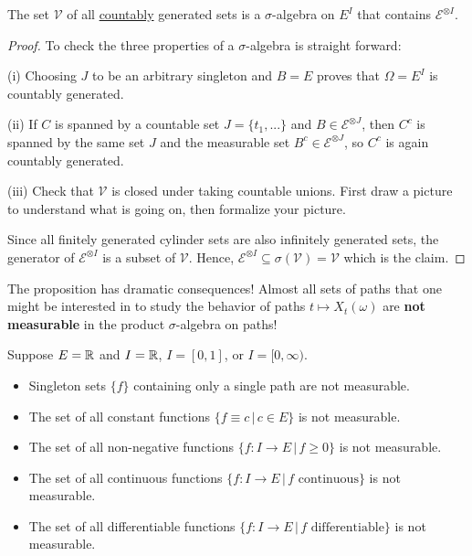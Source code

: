 \begin{laussagewerkzeug}
\begin{prop}
	The set $\mathcal V$ of all \underline{countably} generated sets is a $\sigma$-algebra on $E^I$ that contains $\mathcal E^{\otimes I}$.%
\end{prop}
\end{laussagewerkzeug}
\begin{proof}[Proof]
	To check the three properties of a $\sigma$-algebra is straight forward:\smallskip

	(i) Choosing $J$ to be an arbitrary singleton and $B=E$ proves that $\Omega=E^I$ is countably generated.\smallskip
	
	(ii) If $C$ is spanned by a countable set $J=\{t_1,...\}$ and $B\in \mathcal E^{\otimes J}$, then $C^c$ is spanned by the same set $J$ and the measurable set $B^c\in \mathcal E^{\otimes J}$, so $C^c$ is again countably generated.
	\begin{luebung}
		(iii) Check that $\mathcal V$ is closed under taking countable unions. First draw a picture to understand what is going on, then formalize your picture.
	\end{luebung}
	Since all finitely generated cylinder sets are also infinitely generated sets, the generator of $\mathcal E^{\otimes I}$ is a subset of $\mathcal V$. Hence, $\mathcal E^{\otimes I}\subseteq \sigma(\mathcal V)=\mathcal V$ which is the claim.
\end{proof}
The proposition has dramatic consequences! Almost all sets of paths that one might be interested in to study the behavior of paths $t\mapsto X_t(\omega)$ are \textbf{not measurable} in the product $\sigma$-algebra on paths!
\begin{example}
	Suppose $E=\mathbb{R}$ and $I=\mathbb{R}$, $I=[0,1]$, or $I=[0,\infty)$. 
	\begin{itemize}
	\item Singleton sets $\{f\}$ containing only a single path are not measurable.
	\item The set of all constant functions $\{f\equiv c\,|\,c\in E\}$ is not measurable.
	\item The set of all non-negative functions $\{ f:I\to E\,|\, f\geq 0\}$ is not measurable.
	\item The set of all continuous functions $\{f:I\to E\,|\, f\text{ continuous}\}$ is not measurable.
	\item  The set of all differentiable functions $\{f:I\to E\,|\, f\text{ differentiable}\}$ is not measurable.
	\end{itemize}
\end{example}
